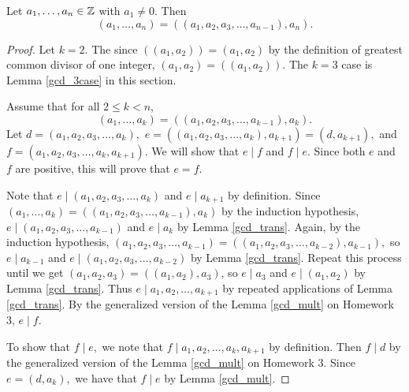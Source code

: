 \documentclass{ximera}
\begin{document}
\begin{prop*}
 Let $a_1,\dots,a_n\in\mathbb Z$ with $a_1\neq 0$.  Then 
	\[(a_1,\dots,a_n)=((a_1,a_2,a_3,\dots,a_{n-1}),a_n).\]
\end{prop*}
\begin{proof}
 Let $k=2$. The since $((a_1,a_2))=(a_1,a_2)$ by the definition of greatest common divisor of one integer,  $(a_1,a_2)=((a_1,a_2))$. The $k=3$ case is Lemma \ref{gcd_3case} in this section.
 
 Assume that for all $2\leq k< n$, 
 	\[(a_1,\dots,a_k)=((a_1,a_2,a_3,\dots,a_{k-1}),a_k).\]
Let $d=(a_1,a_2,a_3,\dots,a_{k}),$
$e=((a_1,a_2,a_3,\dots,a_{k}),a_{k+1})=(d,a_{k+1}),$ and $f= (a_1,a_2,a_3,\dots,a_{k},a_{k+1}).$ We will show that $e\mid f$ and $f\mid e$. Since both $e$ and $f$ are positive, this will prove that $e=f$.

Note that $e\mid (a_1,a_2,a_3,\dots,a_{k})$ and $e\mid a_{k+1}$ by definition. 
Since  $(a_1,\dots,a_k)=((a_1,a_2,a_3,\dots,a_{k-1}),a_k)$ by the induction hypothesis, $e\mid(a_1,a_2,a_3,\dots,a_{k-1})$ and $e\mid a_k$ by Lemma \ref{gcd_trans}. Again, by the induction hypothesis, $(a_1,a_2,a_3,\dots,a_{k-1})=((a_1,a_2,a_3,\dots,a_{k-2}),a_{k-1}),$ so $e\mid a_{k-1}$ and $e\mid (a_1,a_2,a_3,\dots,a_{k-2})$ by Lemma \ref{gcd_trans}. Repeat this process until we get $(a_1,a_2,a_3)=((a_1,a_2),a_3)$, so $e\mid a_3$ and $e\mid (a_1,a_2)$ by Lemma \ref{gcd_trans}. Thus $e\mid a_1,a_2,\dots,a_{k+1}$ by repeated applications of Lemma \ref{gcd_trans}. By the generalized version of the Lemma \ref{gcd_mult} on Homework 3, $e\mid f.$

To show that $f\mid e,$ we note that $f\mid a_1,a_2,\dots, a_k,a_{k+1}$ by definition. Then $f\mid d$ by the generalized version of the Lemma \ref{gcd_mult} on Homework 3. Since $e=(d,a_k),$ we have that $f\mid e$ by Lemma \ref{gcd_mult}.
\end{proof} 
\end{document}
